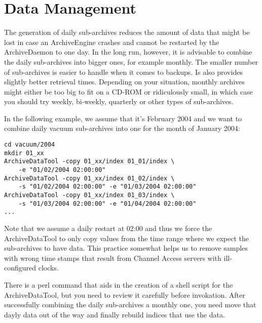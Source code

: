 \section{Data Management}
The generation of daily sub-archives reduces the amount of data that
might be lost in case an ArchiveEngine crashes and cannot be restarted
by the ArchiveDaemon to one day. In the long run, however, it is
advisable to combine the daily sub-archives into bigger ones, for
example monthly. The smaller number of sub-archives is easier to
handle when it comes to backups. Is also provides slightly better
retrieval times. Depending on your situation, monthly archives might either
be too big to fit on a CD-ROM or ridiculously small, in which case you
should try weekly, bi-weekly, quarterly or other types of sub-archives.

In the following example, we assume that it's February 2004 and we want
to combine daily vacuum sub-archives into one for the month of January 2004:
\begin{lstlisting}[frame=none,keywordstyle=\sffamily]
cd vacuum/2004
mkdir 01_xx
ArchiveDataTool -copy 01_xx/index 01_01/index \
    -e "01/02/2004 02:00:00"
ArchiveDataTool -copy 01_xx/index 01_02/index \
    -s "01/02/2004 02:00:00" -e "01/03/2004 02:00:00"
ArchiveDataTool -copy 01_xx/index 01_03/index \
    -s "01/03/2004 02:00:00" -e "01/04/2004 02:00:00"
...
\end{lstlisting}
\noindent Note that we assume a daily restart at 02:00 and thus we
force the ArchiveDataTool to only copy values from the time range
where we expect the sub-archives to have data. This practice somewhat
helps us to remove samples with wrong time stamps that result from
Channel Access servers with ill-configured clocks.

There is a perl command \INDEX{make\_compress\_script.pl} that aids in the
creation of a shell script for the ArchiveDataTool, but you need to
review it carefully before invokation.
After successfully combining the daily sub-archives a monthly one,
you need move that dayly data out of the way and finally
rebuild indices that use the data.

